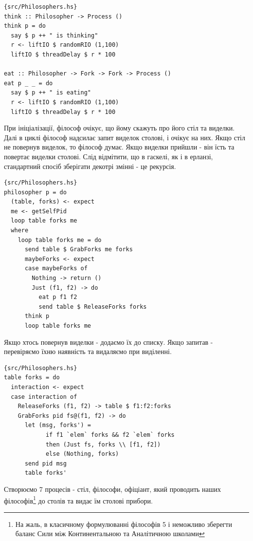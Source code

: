 \documentclass[12pt]{article}
\begin{document}
\begin{lstlisting}{src/Philosophers.hs}
think :: Philosopher -> Process ()
think p = do
  say $ p ++ " is thinking"
  r <- liftIO $ randomRIO (1,100)
  liftIO $ threadDelay $ r * 100

eat :: Philosopher -> Fork -> Fork -> Process ()
eat p _ _ = do
  say $ p ++ " is eating"
  r <- liftIO $ randomRIO (1,100)
  liftIO $ threadDelay $ r * 100
\end{lstlisting}

При ініціалізації, філософ очікує, що йому скажуть про його стіл та виделки. 
Далі в циклі філософ надсилає запит виделок столові, і очікує на них. Якщо стіл
не повернув виделок, то філософ думає. Якщо виделки прийшли - він їсть та повертає 
виделки столові. Слід відмітити, що в гаскелі, як і в ерланзі, стандартний спосіб
зберігати декотрі змінні - це рекурсія.\\

\begin{lstlisting}{src/Philosophers.hs}
philosopher p = do
  (table, forks) <- expect
  me <- getSelfPid
  loop table forks me
  where
    loop table forks me = do      
      send table $ GrabForks me forks
      maybeForks <- expect
      case maybeForks of
        Nothing -> return ()
        Just (f1, f2) -> do
          eat p f1 f2
          send table $ ReleaseForks forks
      think p
      loop table forks me
\end{lstlisting}

Якщо хтось повернув виделки - додаємо їх до списку. Якщо запитав - перевіряємо їхню наявність
та видаляємо при виділенні.\\

\begin{lstlisting}{src/Philosophers.hs}
table forks = do
  interaction <- expect
  case interaction of
    ReleaseForks (f1, f2) -> table $ f1:f2:forks
    GrabForks pid fs@(f1, f2) -> do
      let (msg, forks') =
            if f1 `elem` forks && f2 `elem` forks
            then (Just fs, forks \\ [f1, f2])
            else (Nothing, forks)
      send pid msg
      table forks'
\end{lstlisting}

Створюємо 7 процесів - стіл, філософи, офіціант, який проводить наших  
філософів\footnote{На жаль, в класичному формулюванні філософів 5 і неможливо 
зберегти баланс Сили між Континентальною та Аналітичною школами} до столів та видає
їм столові прибори.\\
\end{document}
